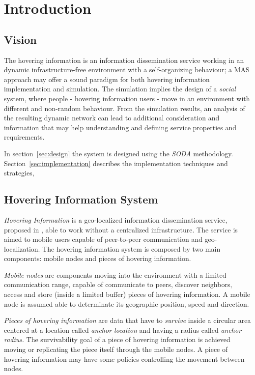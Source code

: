 \section{Introduction}

\subsection{Vision}

The hovering information is an information dissemination service working in an
dynamic infrastructure-free environment with a self-organizing behaviour; a MAS\cite{OEOP,epmas}
approach may offer a sound paradigm for both hovering information
implementation and simulation. The simulation implies the design of a
\emph{social} system, where people - hovering information users - move in an
environment with different and non-random behaviour. From the simulation
results, an analysis of the resulting dynamic network can lead to additional
consideration and information that may help understanding and defining service
properties and requirements.

In section~\ref{sec:design} the system is designed using the \emph{SODA}\cite{soda}
methodology. Section~\ref{sec:implementation} describes the implementation
techniques and strategies,

\subsection{Hovering Information System}

\emph{Hovering Information} is a geo-localized information dissemination
service, proposed in \cite{hover}, able to work without a centralized
infrastructure. The service is aimed to mobile users capable of peer-to-peer
communication and geo-localization. The hovering information system is composed
by two main components: mobile nodes and pieces of hovering information.

\emph{Mobile nodes} are components moving into the environment with a limited
communication range, capable of communicate to peers, discover neighbors,
access and store (inside a limited buffer) pieces of hovering information. A
mobile node is assumed able to determinate its geographic position, speed and
direction.

\emph{Pieces of hovering information} are data that have to \emph{survive}
inside a circular area centered at a location called \emph{anchor location} and
having a radius called \emph{anchor radius}. The survivability goal of a piece
of hovering information is achieved moving or replicating the piece itself
through the mobile nodes. A piece of hovering information may have some
policies controlling the movement between nodes.

